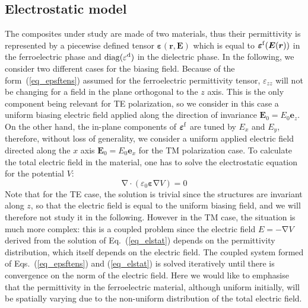 \documentclass[%
 reprint,
 amsmath,amssymb,
 aps,
]{revtex4-2}
\newcommand{\B}{\boldsymbol}
\newcommand{\tens}[1]{\B{#1}}
\newcommand{\grad}{\B{\mathrm{\nabla}}}
\renewcommand{\div}{\B{\mathrm{\nabla\cdotp}}}
\newcommand{\epsftens}{\tens{\varepsilon}^{\rm f}}
\newcommand{\epstens}{\tens{\varepsilon}}
\newcommand{\epsd}{\varepsilon^{\rm d}}
\newcommand{\epsvac}{\varepsilon_{0}}
\newcommand{\equ}[1]{Eq.~(\ref{#1})}
\begin{document}
\subsection*{Electrostatic model}
The composites under study are made of two materials, thus their permittivity
is represented by a piecewise defined tensor $\epstens(\B r, \B E)$ which is
equal to $\epsftens(\B E(\B r))$ in the ferroelectric phase and ${\rm diag}(\epsd)$
in the dielectric phase.
In the following, we consider two different cases for the biasing field.
Because of the form~(\ref{eq_epsftens}) assumed for the ferroelectric permittivity
tensor, $\varepsilon_{zz}$ will not be changing for a field in the plane orthogonal
to the $z$ axis. This is the only component
being relevant for TE polarization, so we consider in this case a uniform biasing
electric field applied along the direction of invariance $\B E_0 = E_{0} \B e_z$.
On the other hand,
the in-plane components of $\epsftens$ are tuned by $E_x$ and $E_y$, therefore,
without loss of generality,
we consider a uniform applied electric field directed along the $x$ axis
$\B E_0 = E_{0} \B e_x$ for the TM polarization case.
To calculate the total electric field in the material, one
has to solve the electrostatic equation for the potential $V$:
\begin{equation}
\div (\epsvac \epstens \grad V) = 0
\label{eq_elstat}
\end{equation}
Note that for the TE case, the solution is trivial since the structures
are invariant along $z$, so that the electric field is equal to the uniform biasing field, and
we will therefore not study it in the following.
However in the TM case, the situation is much more complex: this is a coupled problem since the
electric field $E=-\grad V$ derived from the
solution of \equ{eq_elstat} depends on the permittivity distribution, which
itself depends on the electric field.
The coupled system formed
of Eqs.~(\ref{eq_epsftens}) and (\ref{eq_elstat}) is solved iteratively until there
is convergence on the norm of the electric field.
Here we would like to emphasise that the permittivity in the ferroelectric material, although
uniform initially, will be spatially varying due to the non-uniform distribution
of the total electric field.\\

\end{document}

